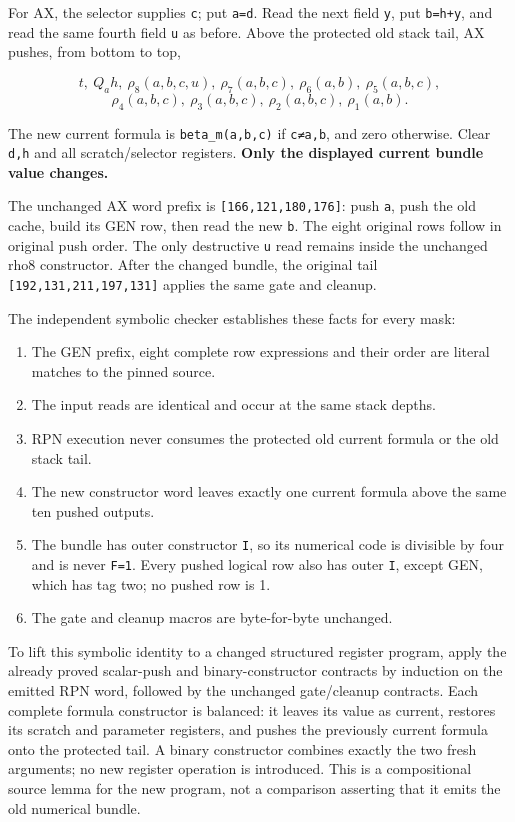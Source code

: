 For AX, the selector supplies \texttt{c}; put
\texttt{a=d\textquotesingle{}}. Read the next field \texttt{y}, put
\texttt{b=h+y}, and read the same fourth field \texttt{u} as before.
Above the protected old stack tail, AX pushes, from bottom to top,

\[
t,\ Q_a h,\ \rho_8(a,b,c,u),\ \rho_7(a,b,c),\ \rho_6(a,b),\ \rho_5(a,b,c),
\] \[
\rho_4(a,b,c),\ \rho_3(a,b,c),\ \rho_2(a,b,c),\ \rho_1(a,b).
\]

The new current formula is \texttt{beta\_m(a,b,c)} if \texttt{c≠a,b},
and zero otherwise. Clear \texttt{d,h} and all scratch/selector
registers. \textbf{Only the displayed current bundle value changes.}

The unchanged AX word prefix is \texttt{{[}166,121,180,176{]}}: push
\texttt{a}, push the old cache, build its GEN row, then read the new
\texttt{b}. The eight original rows follow in original push order. The
only destructive \texttt{u} read remains inside the unchanged rho8
constructor. After the changed bundle, the original tail
\texttt{{[}192,131,211,197,131{]}} applies the same gate and cleanup.

The independent symbolic checker establishes these facts for every mask:

\begin{enumerate}
\def\labelenumi{\arabic{enumi}.}
\tightlist
\item
  The GEN prefix, eight complete row expressions and their order are
  literal matches to the pinned source.
\item
  The input reads are identical and occur at the same stack depths.
\item
  RPN execution never consumes the protected old current formula or the
  old stack tail.
\item
  The new constructor word leaves exactly one current formula above the
  same ten pushed outputs.
\item
  The bundle has outer constructor \texttt{I}, so its numerical code is
  divisible by four and is never \texttt{F=1}. Every pushed logical row
  also has outer \texttt{I}, except GEN, which has tag two; no pushed
  row is 1.
\item
  The gate and cleanup macros are byte-for-byte unchanged.
\end{enumerate}

To lift this symbolic identity to a changed structured register program,
apply the already proved scalar-push and binary-constructor contracts by
induction on the emitted RPN word, followed by the unchanged
gate/cleanup contracts. Each complete formula constructor is balanced:
it leaves its value as current, restores its scratch and parameter
registers, and pushes the previously current formula onto the protected
tail. A binary constructor combines exactly the two fresh arguments; no
new register operation is introduced. This is a compositional source
lemma for the new program, not a comparison asserting that it emits the
old numerical bundle.

